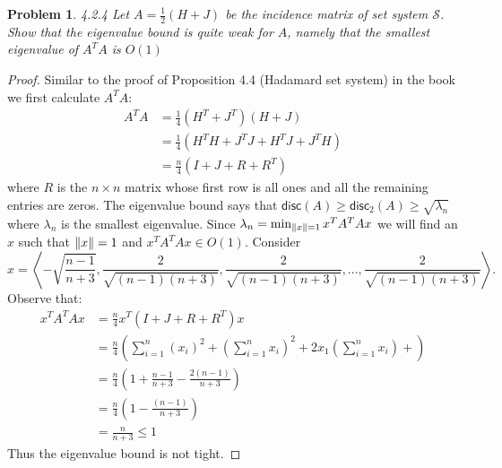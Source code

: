 \documentclass[11pt]{article}
\newcommand\disc{\mathsf{disc}}
\newcommand\SSet{\mathcal{S}}
\newtheorem{problem}{Problem}
\DeclarePairedDelimiter\norm{\parallel}{\parallel}
\begin{document}
\begin{problem}
4.2.4 Let $A = \frac{1}{2}(H + J)$ be the incidence matrix of set system $\SSet$. Show that the eigenvalue bound is quite weak for $A$, namely that the smallest eigenvalue of $A^TA$ is $O(1)$
\end{problem}
\begin{proof}
Similar to the proof of Proposition 4.4 (Hadamard set system) in the book we first calculate $A^TA$:
\begin{align*}
A^TA &= \frac{1}{4} \left(H^T + J^T\right)\left(H + J\right)\\
&= \frac{1}{4} \left(H^TH + J^TJ + H^TJ + J^TH\right)\\
&= \frac{n}{4} \left(I + J + R + R^T\right)
\end{align*}
where $R$ is the $n\times n$ matrix whose first row is all ones and all the remaining entries are zeros. The eigenvalue bound says that $\disc(A) \geq \disc_2(A) \geq \sqrt{\lambda_n}$ where $\lambda_n$ is the smallest eigenvalue. Since $\lambda_n = \min_{\norm{x} = 1}x^T A^TAx$ we will find an $x$ such that $\norm{x} = 1$ and $x^TA^TAx \in O(1)$. Consider 
\[x = \left\langle -\sqrt{\frac{n-1}{n+3}}, \frac{2}{\sqrt{(n-1)(n+3)}}, \frac{2}{\sqrt{(n-1)(n+3)}}, ..., \frac{2}{\sqrt{(n-1)(n+3)}}\right\rangle.\]
Observe that:
\begin{align*}
x^TA^TAx &= \frac{n}{4}x^T\left( I + J + R + R^T \right)x\\
&= \frac{n}{4}\left( \sum_{i=1}^{n}(x_i)^2 + \left(\sum_{i=1}^{n}x_i\right)^2 + 2x_1\left(\sum_{i=1}^{n}x_i\right) + \right)\\
&= \frac{n}{4}\left( 1 + \frac{n-1}{n+3} - \frac{2(n-1)}{n+3}\right) \\
&= \frac{n}{4}\left( 1 - \frac{(n-1)}{n+3}\right) \\
&= \frac{n}{n+3} \leq 1
\end{align*}
Thus the eigenvalue bound is not tight.
\end{proof}
\end{document}
